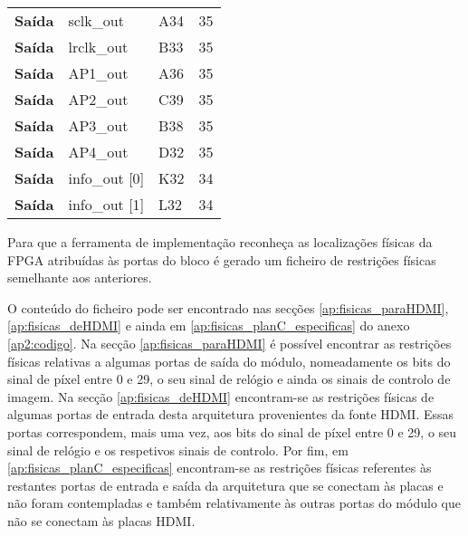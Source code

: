\begin{table}[h!]
\begin{tabular}{rlll}
		\multicolumn{1}{r|}{\textbf{Saída}}   & sclk\_out                             & A34                                      & 35                                         \\
		\multicolumn{1}{r|}{\textbf{Saída}}   & lrclk\_out                            & B33                                      & 35                                         \\
		\multicolumn{1}{r|}{\textbf{Saída}}   & AP1\_out                              & A36                                      & 35                                         \\
		\multicolumn{1}{r|}{\textbf{Saída}}   & AP2\_out                              & C39                                      & 35                                         \\
		\multicolumn{1}{r|}{\textbf{Saída}}   & AP3\_out                              & B38                                      & 35                                         \\
		\multicolumn{1}{r|}{\textbf{Saída}}   & AP4\_out                              & D32                                      & 35                                         \\
		\multicolumn{1}{r|}{\textbf{Saída}}   & info\_out {[}0{]}                     & K32                                      & 34                                         \\
		\multicolumn{1}{r|}{\textbf{Saída}}   & info\_out {[}1{]}                     & L32                                      & 34                                         \\ \hline
	\end{tabular}
\end{table}


Para que a ferramenta de implementação reconheça as localizações físicas da FPGA atribuídas às portas do bloco é gerado um ficheiro de restrições físicas semelhante aos anteriores.

O conteúdo do ficheiro pode ser encontrado nas secções \ref{ap:fisicas_paraHDMI}, \ref{ap:fisicas_deHDMI} e ainda em \ref{ap:fisicas_planC_especificas} do anexo \ref{ap2:codigo}. Na secção \ref{ap:fisicas_paraHDMI} é possível encontrar as restrições físicas relativas a algumas portas de saída do módulo, nomeadamente os bits do sinal de píxel entre 0 e 29, o seu sinal de relógio e ainda os sinais de controlo de imagem. Na secção \ref{ap:fisicas_deHDMI} encontram-se as restrições físicas de algumas portas de entrada desta arquitetura provenientes da fonte HDMI. Essas portas correspondem, mais uma vez, aos bits do sinal de píxel entre 0 e 29, o seu sinal de relógio e os respetivos sinais de controlo. Por fim, em \ref{ap:fisicas_planC_especificas} encontram-se as restrições físicas referentes às restantes portas de entrada e saída da arquitetura que se conectam às placas e não foram contempladas e também relativamente às outras portas do módulo que não se conectam às placas HDMI. 


